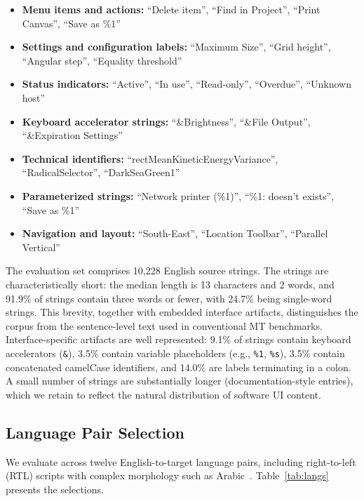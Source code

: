 \documentclass[pdflatex,sn-mathphys-num]{sn-jnl}
\begin{document}
\begin{itemize}
\item \textbf{Menu items and actions:} ``Delete item'', ``Find in Project'', ``Print Canvas'', ``Save as \%1''
\item \textbf{Settings and configuration labels:} ``Maximum Size'', ``Grid height'', ``Angular step'', ``Equality threshold''
\item \textbf{Status indicators:} ``Active'', ``In use'', ``Read-only'', ``Overdue'', ``Unknown host''
\item \textbf{Keyboard accelerator strings:} ``\&Brightness'', ``\&File Output'', ``\&Expiration Settings''
\item \textbf{Technical identifiers:} ``rectMeanKineticEnergyVariance'', ``RadicalSelector'', ``DarkSeaGreen1''
\item \textbf{Parameterized strings:} ``Network printer (\%1)'', ``\%1: doesn't exists'', ``Save as \%1''
\item \textbf{Navigation and layout:} ``South-East'', ``Location Toolbar'', ``Parallel Vertical''
\end{itemize}

The evaluation set comprises 10,228 English source strings. The strings are characteristically short: the median length is 13 characters and 2 words, and 91.9\% of strings contain three words or fewer, with 24.7\% being single-word strings. This brevity, together with embedded interface artifacts, distinguishes the corpus from the sentence-level text used in conventional MT benchmarks. Interface-specific artifacts are well represented: 9.1\% of strings contain keyboard accelerators (\texttt{\&}), 3.5\% contain variable placeholders (e.g., \texttt{\%1}, \texttt{\%s}), 3.5\% contain concatenated camelCase identifiers, and 14.0\% are labels terminating in a colon. A small number of strings are substantially longer (documentation-style entries), which we retain to reflect the natural distribution of software UI content.

\subsection{Language Pair Selection}

We evaluate across twelve English-to-target language pairs, including right-to-left (RTL) scripts with complex morphology such as Arabic~\cite{34}. Table~\ref{tab:langs} presents the selections.
\end{document}
